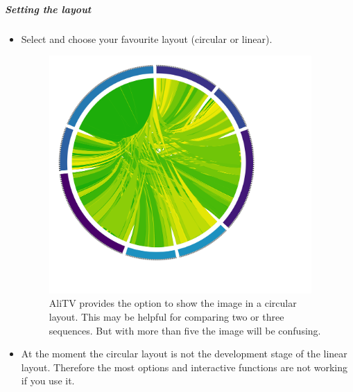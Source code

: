 \documentclass[a4paper]{scrartcl}
\begin{document}
\subparagraph*{Setting the layout}
\begin{itemize}
	\item Select  and choose your favourite layout (circular or linear).
	\begin{figure}[H]
		\centering
		\includegraphics[width=10cm]{circular.png}
		\caption{AliTV provides the option to show the image in a circular layout. This may be helpful for comparing two or three sequences. But with more than five the image will be confusing.}
	\end{figure}
	 \item At the moment the circular layout is not the development stage of the linear layout. Therefore the most options and interactive functions are not working if you use it.
\end{itemize}
\end{document}
